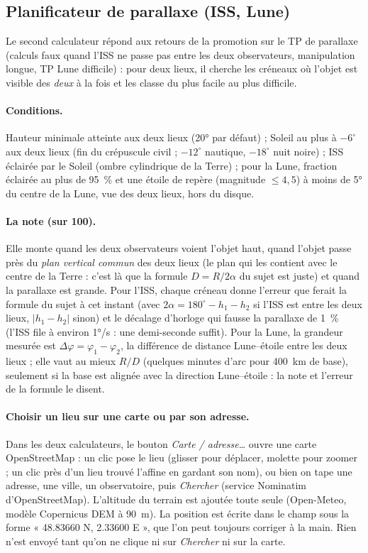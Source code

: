 \subsection{Planificateur de parallaxe (ISS, Lune)}\label{sec:td-planif}
Le second calculateur répond aux retours de la promotion sur le TP de parallaxe (calculs faux quand l'ISS ne passe pas
entre les deux observateurs, manipulation longue, TP Lune difficile) : pour deux lieux, il cherche les créneaux où
l'objet est visible des \emph{deux} à la fois et les classe du plus facile au plus difficile.

\paragraph{Conditions.} Hauteur minimale atteinte aux deux lieux (20° par défaut) ; Soleil au plus à $-6^\circ$ aux deux
lieux (fin du crépuscule civil ; $-12^\circ$ nautique, $-18^\circ$ nuit noire) ; ISS éclairée par le Soleil (ombre cylindrique
de la Terre) ; pour la Lune, fraction éclairée au plus de 95~\% et une étoile de repère (magnitude $\le 4{,}5$) à
moins de 5° du centre de la Lune, vue des deux lieux, hors du disque.

\paragraph{La note (sur 100).} Elle monte quand les deux observateurs voient l'objet haut, quand l'objet passe près du
\emph{plan vertical commun} des deux lieux (le plan qui les contient avec le centre de la Terre : c'est là que la
formule $D = R/2\alpha$ du sujet est juste) et quand la parallaxe est grande. Pour l'ISS, chaque créneau donne
l'erreur que ferait la formule du sujet à cet instant (avec $2\alpha = 180^\circ - h_1 - h_2$ si l'ISS est entre les deux
lieux, $\lvert h_1 - h_2\rvert$ sinon) et le décalage d'horloge qui fausse la parallaxe de 1~\% (l'ISS file à
environ 1°/s : une demi-seconde suffit). Pour la Lune, la grandeur mesurée est $\Delta\varphi = \varphi_1 -
\varphi_2$, la différence de distance Lune--étoile entre les deux lieux ; elle vaut au mieux $R/D$ (quelques minutes
d'arc pour 400~km de base), seulement si la base est alignée avec la direction Lune--étoile : la note et l'erreur de
la formule le disent.

\paragraph{Choisir un lieu sur une carte ou par son adresse.} Dans les deux calculateurs, le bouton \emph{Carte /
adresse…} ouvre une carte OpenStreetMap : un clic pose le lieu (glisser pour déplacer, molette pour zoomer ; un clic
près d'un lieu trouvé l'affine en gardant son nom), ou bien on tape une adresse, une ville, un observatoire, puis
\emph{Chercher} (service Nominatim d'OpenStreetMap). L'altitude du terrain est ajoutée toute seule (Open-Meteo, modèle
Copernicus DEM à 90~m). La position est écrite dans le champ sous la forme « 48.83660 N, 2.33600 E », que l'on peut
toujours corriger à la main. Rien n'est envoyé tant qu'on ne clique ni sur \emph{Chercher} ni sur la carte.

